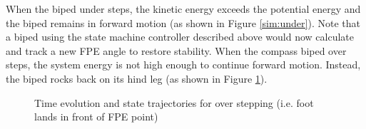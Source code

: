 When the biped under steps, the kinetic energy exceeds the potential energy and the biped remains in forward motion (as shown in Figure \ref{sim:under}). Note that a biped using the state machine controller described above would now calculate and track a new FPE angle to restore stability. When the compass biped over steps, the system energy is not high enough to continue forward motion. Instead, the biped rocks back on its hind leg (as shown in Figure \ref{sim:over}).

\begin{figure}[!h]
	\begin{center}
	\end{center}
  	\caption{Time evolution and state trajectories for over stepping (i.e. foot lands in front of FPE point)}
	\label{sim:over}
\end{figure}

